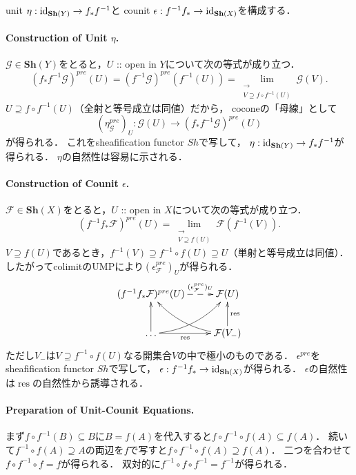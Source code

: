 \documentclass[a4paper]{jsarticle}
\newcommand{\shF}{\mathcal{F}}
\newcommand{\shG}{\mathcal{G}}
\newcommand{\Sh}{\mathbf{Sh}}
\newcommand{\ftorSh}{\mathit{Sh}}
\newcommand{\res}{\operatorname{res}}
\begin{document}
    unit $\eta: \id{\Sh(Y)} \to f_* f^{-1}$と
    counit $\epsilon: f^{-1} f_* \to \id{\Sh(X)}$を構成する．

    \paragraph{Construction of Unit $\eta$.}
    $\shG \in \Sh(Y)$をとると，$U$ :: open in $Y$について次の等式が成り立つ．
    \[ (f_* f^{-1} \shG)^{pre}(U)=(f^{-1} \shG)^{pre}(f^{-1}(U))=\lim_{\substack{\longrightarrow \\ V \supseteq f \circ f^{-1}(U)}} \shG(V). \]
    $U \supseteq f \circ f^{-1}(U)$（全射と等号成立は同値）だから，
    coconeの「母線」として
    \[ (\eta^{pre}_{\shG})_U: \shG(U) \to (f_* f^{-1} \shG)^{pre}(U) \]
    が得られる．
    これをsheafification functor $\ftorSh$で写して，
    $\eta: \id{\Sh(Y)} \to f_* f^{-1}$が得られる．
    $\eta$の自然性は容易に示される．

    \paragraph{Construction of Counit $\epsilon$.}
    $\shF \in \Sh(X)$をとると，$U$ :: open in $X$について次の等式が成り立つ．
    \[ (f^{-1} f_* \shF)^{pre}(U)=\lim_{\substack{\longrightarrow \\ V \supseteq f(U)}} \shF(f^{-1}(V)). \]
    $V \supseteq f(U)$であるとき，$f^{-1}(V) \supseteq f^{-1} \circ f(U) \supseteq U$（単射と等号成立は同値）．
    したがってcolimitのUMPにより$(\epsilon^{pre}_{\shF})_U$が得られる．
    \[
    \xymatrix
    {
    (f^{-1} f_* \shF)^{pre}(U) \ar@{-->}[r]^-{(\epsilon^{pre}_{\shF})_U}& \shF(U) \\
    \dots \ar[r]_-{\res} \ar[u] \ar@/_10pt/[ur]& \shF(V_{-}) \ar[u]_-{\res} \ar@/^10pt/[ul]
    }
    \]
    ただし$V_{-}$は$V \supseteq f^{-1} \circ f(U)$なる開集合$V$の中で極小のものである．
    $\epsilon^{pre}$をsheafification functor $\ftorSh$で写して，
    $\epsilon: f^{-1} f_* \to \id{\Sh(X)}$が得られる．
    $\epsilon$の自然性は$\res$の自然性から誘導される．

    \paragraph{Preparation of Unit-Counit Equations.}
    まず$f \circ f^{-1}(B) \subseteq B$に$B=f(A)$を代入すると$f \circ f^{-1} \circ f(A) \subseteq f(A)$．
    続いて$f^{-1} \circ f(A) \supseteq A$の両辺を$f$で写すと$f \circ f^{-1} \circ f(A) \supseteq f(A)$．
    二つを合わせて$f \circ f^{-1} \circ f=f$が得られる．
    双対的に$f^{-1} \circ f \circ f^{-1}=f^{-1}$が得られる．
\end{document}

